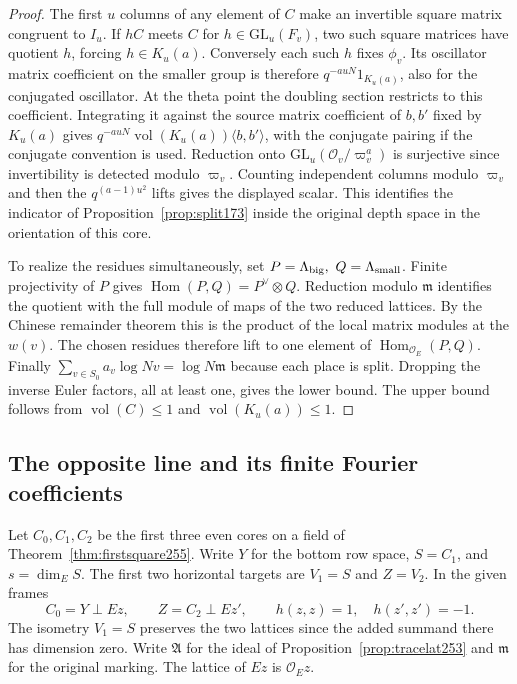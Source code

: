 \documentclass[a4paper,11pt]{article}
\theoremstyle{definition}
\theoremstyle{remark}
\numberwithin{equation}{section}
\begin{document}
\begin{proof}
The first \(u\) columns of any element of \(C\) make an
invertible square matrix congruent to \(I_u\). If \(hC\)
meets \(C\) for \(h\in\mathrm{GL}_u(F_v)\), two such
square matrices have quotient \(h\), forcing \(h\in K_u(a)\).
Conversely each such \(h\) fixes \(\phi_v\). Its oscillator
matrix coefficient on the smaller group is therefore
\(q^{-auN}1_{K_u(a)}\), also for the conjugated oscillator.
At the theta point the doubling section restricts to this
coefficient. Integrating it against the source matrix coefficient
of \(b,b'\) fixed by \(K_u(a)\) gives
\(q^{-auN}\operatorname{vol}(K_u(a))\langle b,b'\rangle\),
with the conjugate pairing if the conjugate convention is used.
Reduction onto \(\mathrm{GL}_u(\mathcal O_v/\varpi_v^a)\) is
surjective since invertibility is detected modulo \(\varpi_v\).
Counting independent columns modulo \(\varpi_v\) and then
the \(q^{(a-1)u^2}\) lifts gives the displayed scalar.
This identifies the indicator of Proposition~\ref{prop:split173}
inside the original depth space in the orientation of this core.

To realize the residues simultaneously, set
\(P=\Lambda_{\rm big},\ Q=\Lambda_{\rm small}\).
Finite projectivity of \(P\) gives
\(\operatorname{Hom}(P,Q)=P^\vee\otimes Q\). Reduction modulo
\(\mathfrak m\) identifies the quotient with the full module of
maps of the two reduced lattices. By the Chinese remainder
theorem this is the product of the local matrix modules at
the \(w(v)\). The chosen residues therefore lift to one
element of \(\operatorname{Hom}_{\mathcal O_E}(P,Q)\).
Finally \(\sum_{v\in S_0}a_v\log Nv=\log N\mathfrak m\) because
each place is split. Dropping the inverse Euler factors, all
at least one, gives the lower bound. The upper bound follows
from \(\operatorname{vol}(C)\le1\) and
\(\operatorname{vol}(K_u(a))\le1\).
\end{proof}

\subsection{The opposite line and its finite Fourier coefficients}\label{nav:IX-37}
Let \(C_0,C_1,C_2\) be the first three even cores on a field of
Theorem~\ref{thm:firstsquare255}. Write \(Y\) for the bottom
row space, \(S=C_1\), and \(s=\dim_E S\). The first two horizontal
targets are \(V_1=S\) and \(Z=V_2\). In the given frames
\[
 C_0=Y\perp Ez,\qquad Z=C_2\perp Ez',\qquad
 h(z,z)=1,\quad h(z',z')=-1 .
\]
The isometry \(V_1=S\) preserves the two lattices since the added
summand there has dimension zero. Write \(\mathfrak A\) for the
ideal of Proposition~\ref{prop:tracelat253} and \(\mathfrak m\)
for the original marking. The lattice of \(Ez\) is \(\mathcal O_Ez\).
\end{document}
